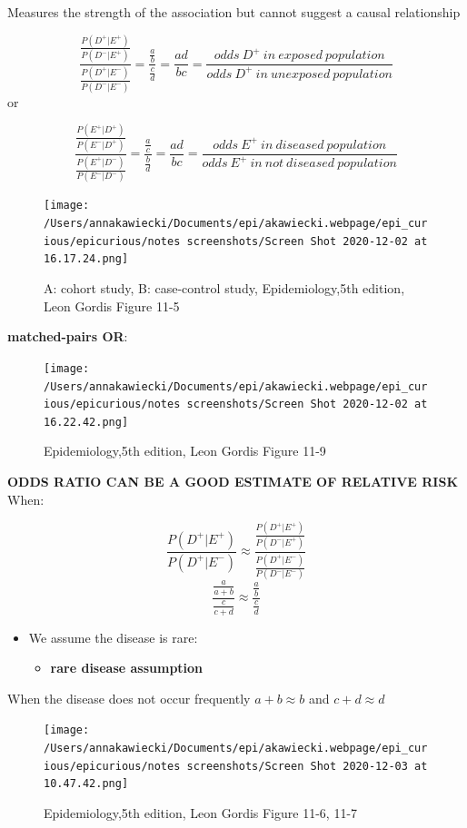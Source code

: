\documentclass[
]{article}
\providecommand{\tightlist}{%
  \setlength{\itemsep}{0pt}\setlength{\parskip}{0pt}}
\begin{document}
Measures the strength of the association but cannot suggest a causal
relationship

\[\frac{\frac{P(D^+|E^+)}{P(D^-|E^+)}}{\frac{P(D^+|E^-)}{P(D^-|E^-)}}=\frac{\frac{a}{b}}{\frac{c}{d}}=\frac{ad}{bc}=\frac{odds\:D^+\:in\:exposed\:population}{odds\:D^+\:in\:unexposed\:population}\]
or

\[\frac{\frac{P(E^+|D^+)}{P(E^-|D^+)}}{\frac{P(E^+|D^-)}{P(E^-|D^-)}}=\frac{\frac{a}{c}}{\frac{b}{d}}=\frac{ad}{bc}=\frac{odds\:E^+\:in\:diseased\:population}{odds\:E^+\:in\:not\:diseased\:population}\]

\begin{figure}
\centering
\texttt{[image: /Users/annakawiecki/Documents/epi/akawiecki.webpage/epi\_curious/epicurious/notes screenshots/Screen Shot 2020-12-02 at 16.17.24.png]}
\caption{A: cohort study, B: case-control study, Epidemiology,5th
edition, Leon Gordis Figure 11-5}
\end{figure}

\textbf{matched-pairs OR}:

\begin{figure}
\centering
\texttt{[image: /Users/annakawiecki/Documents/epi/akawiecki.webpage/epi\_curious/epicurious/notes screenshots/Screen Shot 2020-12-02 at 16.22.42.png]}
\caption{Epidemiology,5th edition, Leon Gordis Figure 11-9}
\end{figure}

\textbf{ODDS RATIO CAN BE A GOOD ESTIMATE OF RELATIVE RISK} When:

\[\frac{P(D^+|E^+)}{P(D^+|E^-)}\approx\frac{\frac{P(D^+|E^+)}{P(D^-|E^+)}}{\frac{P(D^+|E^-)}{P(D^-|E^-)}}\]
\[\frac{\frac{a}{a+b}}{\frac{c}{c+d}} \approx \frac{\frac{a}{b}}{\frac{c}{d}}\]

\begin{itemize}
\tightlist
\item
  We assume the disease is rare:

  \begin{itemize}
  \tightlist
  \item
    \textbf{rare disease assumption}
  \end{itemize}
\end{itemize}

When the disease does not occur frequently \(a+b \approx b\) and
\(c+d \approx d\)

\begin{figure}
\centering
\texttt{[image: /Users/annakawiecki/Documents/epi/akawiecki.webpage/epi\_curious/epicurious/notes screenshots/Screen Shot 2020-12-03 at 10.47.42.png]}
\caption{Epidemiology,5th edition, Leon Gordis Figure 11-6, 11-7}
\end{figure}
\end{document}

